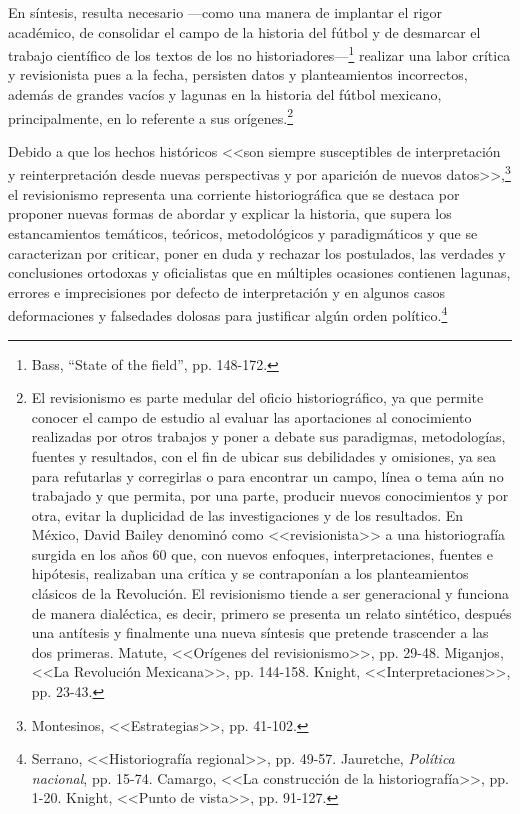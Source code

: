\documentclass[11pt,a5paper,twoside]{book} %
\begin{document}
En síntesis, resulta necesario ---como una manera de implantar el rigor académico, de consolidar el campo de la historia del fútbol y de desmarcar el trabajo científico de los textos de los no historiadores---\footnote{Bass, ``State of the field'', pp. 148-172.} realizar una labor crítica y revisionista pues a la fecha, persisten datos y planteamientos incorrectos, además de grandes vacíos y lagunas en la historia del fútbol mexicano, principalmente, en lo referente a sus orígenes.\footnote{El revisionismo es parte medular del oficio historiográfico, ya que permite conocer el campo de estudio al evaluar las aportaciones al conocimiento realizadas por otros trabajos y poner a debate sus paradigmas, metodologías, fuentes y resultados, con el fin de ubicar sus debilidades y omisiones, ya sea para refutarlas y corregirlas o para encontrar un campo, línea o tema aún no trabajado y que permita, por una parte, producir nuevos conocimientos y por otra, evitar la duplicidad de las investigaciones y de los resultados. En México, David Bailey denominó como <<revisionista>> a una historiografía surgida en los años 60 que, con nuevos enfoques, interpretaciones, fuentes e hipótesis, realizaban una crítica y se contraponían a los planteamientos clásicos de la Revolución. El revisionismo tiende a ser generacional y funciona de manera dialéctica, es decir, primero se presenta un relato sintético, después una antítesis y finalmente una nueva síntesis que pretende trascender a las dos primeras. Matute, <<Orígenes del revisionismo>>, pp. 29-48. Miganjos, <<La Revolución Mexicana>>, pp. 144-158. Knight, <<Interpretaciones>>, pp. 23-43.}

Debido a que los hechos históricos <<son siempre susceptibles de interpretación y reinterpretación desde nuevas perspectivas y por aparición de nuevos datos>>,\footnote{Montesinos, <<Estrategias>>, pp. 41-102.} el revisionismo representa una corriente historiográfica que se destaca por proponer nuevas formas de abordar y explicar la historia, que supera los estancamientos temáticos, teóricos, metodológicos y paradigmáticos y que se caracterizan por criticar, poner en duda y rechazar los postulados, las verdades y conclusiones ortodoxas y oficialistas que en múltiples ocasiones contienen lagunas, errores e imprecisiones por defecto de interpretación y en algunos casos deformaciones y falsedades dolosas para justificar algún orden político.\footnote{Serrano, <<Historiografía regional>>, pp. 49-57. Jauretche, \emph{Política nacional}, pp. 15-74. Camargo, <<La construcción de la historiografía>>, pp. 1-20. Knight, <<Punto de vista>>, pp. 91-127.}
\end{document}
